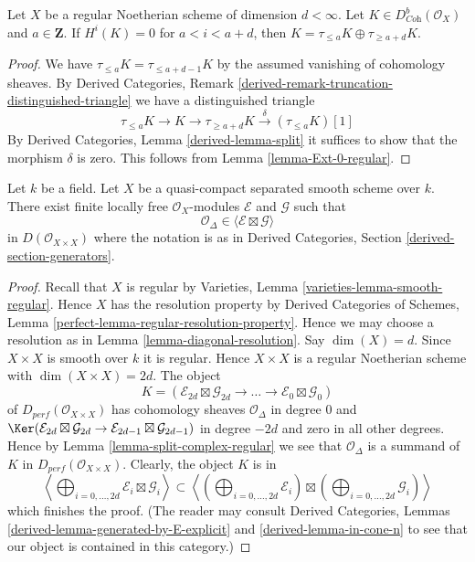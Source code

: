 \begin{lemma}
\label{lemma-split-complex-regular}
Let $X$ be a regular Noetherian scheme of dimension $d < \infty$.
Let $K \in D^b_{\textit{Coh}}(\mathcal{O}_X)$ and $a \in \mathbf{Z}$.
If $H^i(K) = 0$ for $a < i < a + d$, then
$K = \tau_{\leq a}K \oplus \tau_{\geq a + d}K$.
\end{lemma}

\begin{proof}
We have $\tau_{\leq a}K = \tau_{\leq a + d - 1}K$ by the assumed
vanishing of cohomology sheaves. By Derived Categories, Remark
\ref{derived-remark-truncation-distinguished-triangle}
we have a distinguished triangle
$$
\tau_{\leq a}K \to K \to \tau_{\geq a + d}K \xrightarrow{\delta}
(\tau_{\leq a}K)[1]
$$
By Derived Categories, Lemma \ref{derived-lemma-split} it
suffices to show that the morphism $\delta$ is zero.
This follows from Lemma \ref{lemma-Ext-0-regular}.
\end{proof}

\begin{lemma}
\label{lemma-diagonal-trick}
Let $k$ be a field. Let $X$ be a quasi-compact separated smooth scheme over $k$.
There exist finite locally free $\mathcal{O}_X$-modules
$\mathcal{E}$ and $\mathcal{G}$ such that
$$
\mathcal{O}_\Delta \in \langle \mathcal{E} \boxtimes \mathcal{G} \rangle
$$
in $D(\mathcal{O}_{X \times X})$ where the notation is as in
Derived Categories, Section \ref{derived-section-generators}.
\end{lemma}

\begin{proof}
Recall that $X$ is regular by
Varieties, Lemma \ref{varieties-lemma-smooth-regular}.
Hence $X$ has the resolution property by
Derived Categories of Schemes, Lemma
\ref{perfect-lemma-regular-resolution-property}.
Hence we may choose a resolution as in Lemma \ref{lemma-diagonal-resolution}.
Say $\dim(X) = d$. Since $X \times X$ is smooth over $k$ it is regular.
Hence $X \times X$ is a regular Noetherian scheme with
$\dim(X \times X) = 2d$. The object
$$
K = (\mathcal{E}_{2d} \boxtimes \mathcal{G}_{2d} \to
\ldots \to
\mathcal{E}_0 \boxtimes \mathcal{G}_0)
$$
of $D_{perf}(\mathcal{O}_{X \times X})$
has cohomology sheaves $\mathcal{O}_\Delta$
in degree $0$ and $\Ker(\mathcal{E}_{2d} \boxtimes \mathcal{G}_{2d} \to
\mathcal{E}_{2d-1} \boxtimes \mathcal{G}_{2d-1})$ in degree $-2d$ and zero
in all other degrees.
Hence by Lemma \ref{lemma-split-complex-regular} we see that
$\mathcal{O}_\Delta$ is a summand of $K$ in
$D_{perf}(\mathcal{O}_{X \times X})$.
Clearly, the object $K$ is in
$$
\left\langle
\bigoplus\nolimits_{i = 0, \ldots, 2d} \mathcal{E}_i \boxtimes \mathcal{G}_i
\right\rangle
\subset
\left\langle
\left(\bigoplus\nolimits_{i = 0, \ldots, 2d} \mathcal{E}_i\right)
\boxtimes
\left(\bigoplus\nolimits_{i = 0, \ldots, 2d} \mathcal{G}_i\right)
\right\rangle
$$
which finishes the proof. (The reader may consult
Derived Categories, Lemmas \ref{derived-lemma-generated-by-E-explicit} and
\ref{derived-lemma-in-cone-n} to see that our object is contained in this
category.)
\end{proof}

